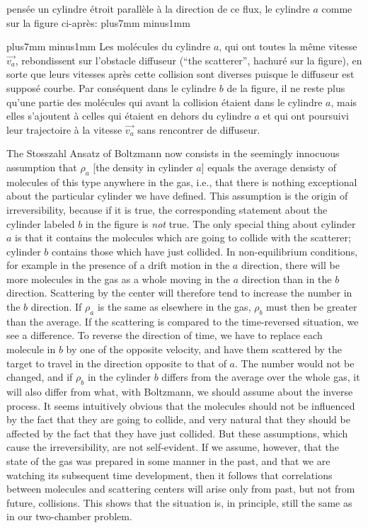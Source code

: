 pens\'ee un cylindre \'etroit parall\`ele \`a la direction de ce flux, le 
cylindre $a$ comme sur la figure ci-apr\`es:
\vskip1mm plus7mm minus1mm
\epsfxsize=100mm
\centerline{}
\vskip1mm plus7mm minus1mm
Les mol\'ecules du cylindre $a$, qui ont toutes la m\^eme vitesse 
$\vec{v_a}$, rebondissent sur l'obstacle diffuseur (``the scatterer'', 
hachur\'e sur la figure), en sorte que leurs vitesses apr\`es cette 
collision sont diverses puisque le diffuseur est suppos\'e courbe. 
Par cons\'equent dans le cylindre $b$ de la 
figure, il ne reste plus qu'une partie des mol\'ecules qui avant la 
collision \'etaient dans le cylindre $a$, mais elles s'ajoutent \`a 
celles qui \'etaient en dehors du cylindre $a$ et qui ont poursuivi leur 
trajectoire \`a la vitesse $\vec{v_a}$ sans rencontrer de diffuseur. 
\medskip
{\cit  The Stosszahl Ansatz of Boltzmann now consists in the seemingly
innocuous assumption that $\rho_a$ [the density in cylinder $a$] equals 
the average densisty of molecules of this type anywhere in the gas, 
i.e., that there is nothing exceptional about the particular cylinder 
we have defined. 
\smallskip
This assumption is the origin of irreversibility, because if it is true, 
the corresponding statement about the cylinder labeled $b$ in the figure 
is {\it not} true. The only special thing about cylinder $a$ is that it 
contains the molecules which are going to collide with the scatterer; 
cylinder $b$ contains those which have just collided. In non-equilibrium 
conditions, for example in the presence of a drift motion in the $a$ 
direction, there will be more molecules in the gas as a whole moving 
in the $a$ direction than in the $b$ direction. Scattering by the center 
will therefore tend to increase the number in the $b$ direction. 
If $\rho_a$ is the same as elsewhere in the gas, $\rho_b$ must then be 
greater than the average. 
\smallskip
If the scattering is compared to the time-reversed situation, we see a 
difference. To reverse the direction of time, we have to replace each  
molecule in $b$ by one of the opposite velocity, and have them scattered 
by the target to travel in the direction opposite to that of $a$. The 
number would not be changed, and if $\rho_b$ in the cylinder $b$ differs 
from the average over the whole gas, it will also differ from what, with 
Boltzmann, we should assume about the inverse process. 
\smallskip
It seems intuitively obvious that the molecules should not be influenced 
by the fact that they are going to collide, and very natural that they should 
be affected by the fact that they have just collided. But these assumptions, 
which cause the irreversibility, are not self-evident. If we assume, however, 
that the state of the gas was prepared in some manner in the past, and that 
we are watching its subsequent time development, then it follows that 
correlations between molecules and scattering centers will arise only from 
past, but not from future, collisions. This shows that the situation is, 
in principle, still the same as in our two-chamber problem. \par  }
